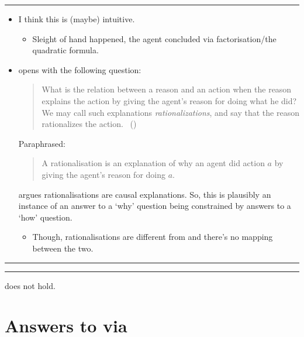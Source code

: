 \documentclass[10pt]{article}
\newcommand\lLine{{\color{lightgray} \noindent\rule{\textwidth}{0.4pt}}}
\newcommand\sepLine{
  \vfill
  \par\noindent\rule{\textwidth}{0.4pt}%
  \vspace{-10pt}%
  \par\noindent\rule{\textwidth}{0.4pt}
  \vfill}
\begin{document}
\lLine

\begin{note}
  \begin{itemize}
  \item
    I think this is (maybe) intuitive.
    \begin{itemize}
    \item
      Sleight of hand happened, the agent concluded via factorisation/the quadratic formula.
    \end{itemize}
  \item
    \citeauthor{Davidson:1963aa} opens  with the following question:

    \begin{quote}
      What is the relation between a reason and an action when the reason explains the action by giving the agent's reason for doing what he did?
      We may call such explanations \emph{rationalizations}, and say that the reason rationalizes the action.%
      \mbox{ }\hfill\mbox{(\citeyear[685]{Davidson:1963aa})}
    \end{quote}

    Paraphrased:
    \begin{quote}
      A rationalisation is an explanation of why an agent did action \(a\) by giving the agent's reason for doing \(a\).
    \end{quote}
    \citeauthor{Davidson:1963aa} argues rationalisations are causal explanations.
    So, this is plausibly an instance of an answer to a `why' question being constrained by answers to a `how' question.
    \begin{itemize}
    \item
      Though, rationalisations are different from  and there's no mapping between the two.
    \end{itemize}
  \end{itemize}
\end{note}

\sepLine

\begin{note}
  \begin{thesis}
    \issueInclusion{} does not hold.
  \end{thesis}
\end{note}

\vfill


\newpage

\section{Answers to \qWhy{} via }
\label{sec:answers-qwhy}
\end{document}
